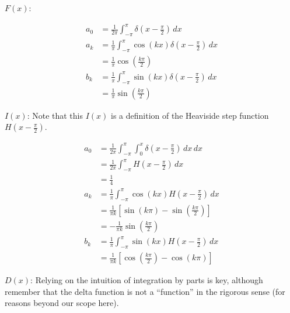 \documentclass[a4paper]{article}
\begin{document}
\( F \!\left( x \right) \):

\begin{align*}
	a_{0} & = \frac{1}{2 \pi} \int^{\pi}_{-\pi} \delta\!\left( x - \frac{\pi}{2} \right) \, dx \\ 
	a_{k} & = \frac{1}{\pi} \int^{\pi}_{-\pi} \cos\!\left(kx\right) \delta\!\left( x - \frac{\pi}{2} \right) \, dx \\
	 & = \frac{1}{\pi} \cos\!\left(\frac{k \pi}{2}\right) \\
	b_{k} & = \frac{1}{\pi} \int^{\pi}_{-\pi} \sin\!\left(kx\right) \delta\!\left( x - \frac{\pi}{2} \right) \, dx \\
	      & = \frac{1}{\pi} \sin\!\left(\frac{k \pi}{2}\right) 
\end{align*}

\( I \!\left( x \right) \): Note that this \( I \!\left( x \right) \) is a definition of the Heaviside step function \( \displaystyle{H \!\left( x - \frac{\pi}{2} \right)} \).

\begin{align*}
	a_{0} & = \frac{1}{2 \pi} \int^{\pi}_{-\pi} \int^{x}_{0} \delta\!\left( x - \frac{\pi}{2} \right) \, dx \, dx \\
	 & = \frac{1}{2 \pi} \int^{\pi}_{-\pi} H \!\left( x - \frac{\pi}{2} \right) \, dx \\ 
	 & = \frac{1}{4} \\
	a_{k} & = \frac{1}{\pi} \int^{\pi}_{-\pi} \cos\!\left(kx\right) H \!\left( x - \frac{\pi}{2} \right) \, dx \\
	      & = \frac{1}{\pi k} \!\left[ \sin\!\left(k \pi\right) - \sin\!\left(\frac{k \pi}{2}\right) \right] \\
	      & = -\frac{1}{\pi k} \sin\!\left(\frac{k \pi}{2}\right) \\
	b_{k} & = \frac{1}{\pi} \int^{\pi}_{-\pi} \sin\!\left(kx\right) H \!\left( x - \frac{\pi}{2} \right) \, dx \\
	      & = \frac{1}{\pi k} \!\left[ \cos\!\left(\frac{k \pi}{2}\right) - \cos\!\left(k \pi\right) \right]
\end{align*}

\( D \!\left( x \right) \): Relying on the intuition of integration by parts is key, although remember that the delta function is not a ``function'' in the rigorous sense (for reasons beyond our scope here).
\end{document}
